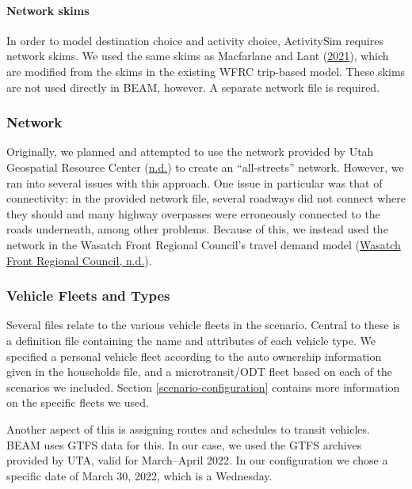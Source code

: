 \documentclass[
]{article}
\begin{document}
\hypertarget{network-skims}{%
\paragraph{Network skims}\label{network-skims}}

In order to model destination choice and activity choice, ActivitySim requires network skims. We used the same skims as Macfarlane and Lant (\protect\hyperlink{ref-MacfarlaneLant}{2021}), which are modified from the skims in the existing WFRC trip-based model. These skims are not used directly in BEAM, however. A separate network file is required.

\hypertarget{network}{%
\subsubsection{Network}\label{network}}

Originally, we planned and attempted to use the network provided by Utah Geospatial Resource Center (\protect\hyperlink{ref-UGRCnetwork}{n.d.}) to create an ``all-streets'' network. However, we ran into several issues with this approach. One issue in particular was that of connectivity: in the provided network file, several roadways did not connect where they should and many highway overpasses were erroneously connected to the roads underneath, among other problems. Because of this, we instead used the network in the Wasatch Front Regional Council's travel demand model (\protect\hyperlink{ref-WFRCnetwork}{Wasatch Front Regional Council, n.d.}).

\hypertarget{vehicle-fleets-and-types}{%
\subsubsection{Vehicle Fleets and Types}\label{vehicle-fleets-and-types}}

Several files relate to the various vehicle fleets in the scenario. Central to these is a definition file containing the name and attributes of each vehicle type. We specified a personal vehicle fleet according to the auto ownership information given in the households file, and a microtransit/ODT fleet based on each of the scenarios we included. Section \ref{scenario-configuration} contains more information on the specific fleets we used.

Another aspect of this is assigning routes and schedules to transit vehicles. BEAM uses GTFS data for this. In our case, we used the GTFS archives provided by UTA, valid for March--April 2022. In our configuration we chose a specific date of March 30, 2022, which is a Wednesday.
\end{document}
